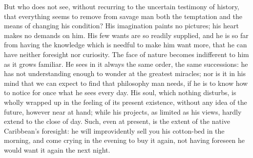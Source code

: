 \documentclass[12pt]{report}
\begin{document}
But who does not see, without recurring to the uncertain testimony of history, that everything seems to remove from savage man both the temptation and the means of changing his condition? His imagination paints no pictures; his heart makes no demands on him. His few wants are so readily supplied, and he is so far from having the knowledge which is needful to make him want more, that he can have neither foresight nor curiosity. The face of nature becomes indifferent to him as it grows familiar. He sees in it always the same order, the same successions: he has not understanding enough to wonder at the greatest miracles; nor is it in his mind that we can expect to find that philosophy man needs, if he is to know how to notice for once what he sees every day. His soul, which nothing disturbs, is wholly wrapped up in the feeling of its present existence, without any idea of the future, however near at hand; while his projects, as limited as his views, hardly extend to the close of day. Such, even at present, is the extent of the native Caribbean's foresight: he will improvidently sell you his cotton-bed in the morning, and come crying in the evening to buy it again, not having foreseen he would want it again the next night.
\end{document}
